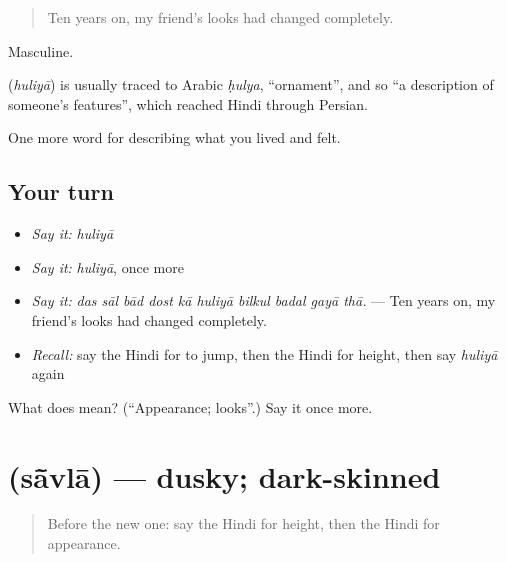 \begin{quote}
Ten years on, my friend's looks had changed completely.
\end{quote}

Masculine.

\begin{cousinweb}
\textbf{} (\emph{huliyā}) is usually traced to Arabic \emph{ḥulya}, \textquotedblleft{}ornament\textquotedblright{}, and so \textquotedblleft{}a description of someone's features\textquotedblright{}, which reached Hindi through Persian.
\end{cousinweb}

\begin{grammarlens}[title={What you've built}]
One more word for describing what you lived and felt.
\end{grammarlens}

\subsection*{Your turn}
\begin{itemize}
\raggedright
  \item \emph{Say it:} \emph{huliyā}
  \item \emph{Say it:} \emph{huliyā}, once more
  \item \emph{Say it:} \emph{das sāl bād dost kā huliyā bilkul badal gayā thā.} — Ten years on, my friend's looks had changed completely.
  \item \emph{Recall:} say the Hindi for to jump, then the Hindi for height, then say \emph{huliyā} again
\end{itemize}

\begin{tcolorbox}[breakable,colback=teal!4,colframe=teal!35!black,title={Before you move on}]
What does  mean? (\textquotedblleft{}Appearance; looks\textquotedblright{}.) Say it once more.
\end{tcolorbox}
\section[\texorpdfstring{\hi{साँवला} (sā̃vlā)}{साँवला (sā̃vlā)}]{ (sā̃vlā) — dusky; dark-skinned}

\label{lesson:HI-C482-savla}



\begin{quote}
Before the new one: say the Hindi for height, then the Hindi for appearance.
\end{quote}

